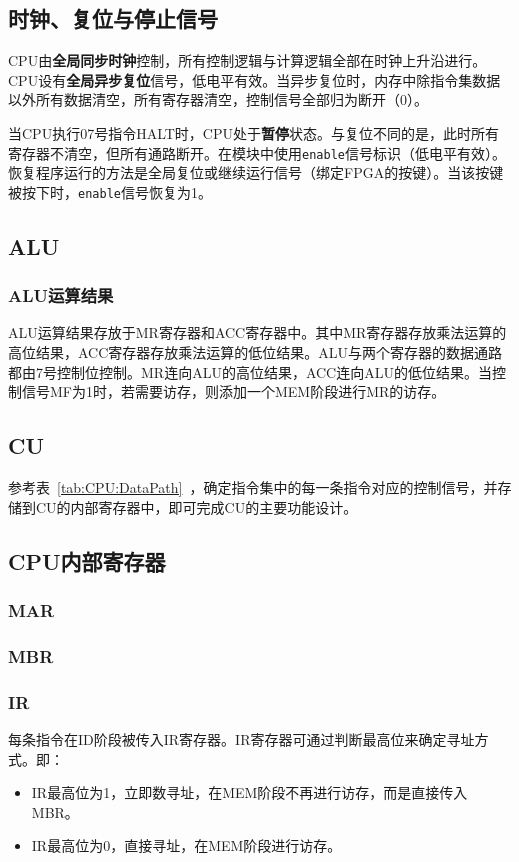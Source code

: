 \documentclass[lang=cn,a4paper,newtx]{elegantpaper}
\begin{document}
\subsection{时钟、复位与停止信号}
CPU由\textbf{全局同步时钟}控制，所有控制逻辑与计算逻辑全部在时钟上升沿进行。CPU设有\textbf{全局异步复位}信号，低电平有效。当异步复位时，内存中除指令集数据以外所有数据清空，所有寄存器清空，控制信号全部归为断开（0）。

当CPU执行07号指令HALT时，CPU处于\textbf{暂停}状态。与复位不同的是，此时所有寄存器不清空，但所有通路断开。在模块中使用\texttt{enable}信号标识（低电平有效）。恢复程序运行的方法是全局复位或继续运行信号（绑定FPGA的按键）。当该按键被按下时，\texttt{enable}信号恢复为1。
\subsection{ALU}
\subsubsection{ALU运算结果}
ALU运算结果存放于MR寄存器和ACC寄存器中。其中MR寄存器存放乘法运算的高位结果，ACC寄存器存放乘法运算的低位结果。ALU与两个寄存器的数据通路都由7号控制位控制。MR连向ALU的高位结果，ACC连向ALU的低位结果。当控制信号MF为1时，若需要访存，则添加一个MEM阶段进行MR的访存。

\subsection{CU}
参考表~\ref{tab:CPU:DataPath}~，确定指令集中的每一条指令对应的控制信号，并存储到CU的内部寄存器中，即可完成CU的主要功能设计。


\subsection{CPU内部寄存器}
\subsubsection{MAR}
\subsubsection{MBR}
\subsubsection{IR}
每条指令在ID阶段被传入IR寄存器。IR寄存器可通过判断最高位来确定寻址方式。即：
\begin{itemize}
  \item IR最高位为1，立即数寻址，在MEM阶段不再进行访存，而是直接传入MBR。
  \item IR最高位为0，直接寻址，在MEM阶段进行访存。
\end{itemize}
\end{document}
